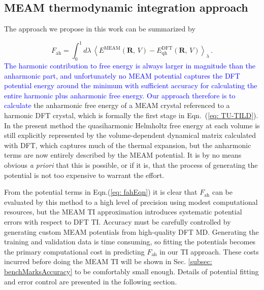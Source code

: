 \documentclass[twocolumn,american,aps,prb,showpacs,showkeys,amsmath,amssymb,superscriptaddress,a4]{revtex4-1}
\begin{document}
\subsection{MEAM thermodynamic integration approach\label{subsec: MTILDapproach}}

The approach we propose in this work can be summarized by

\begin{equation}
F_{\text{ah}}^{\text{}}=\int_{0}^{1}d\lambda\,\left\langle E^{\text{MEAM}}(\mathbf{R},\,V)-E_{\text{qh}}^{\text{DFT}}(\mathbf{R},\,V)\right\rangle _{\lambda}\,.
\label{eq: fahEqn}
\end{equation}
  \textcolor{blue}{The harmonic contribution to free energy is always larger in magnitude than the anharmonic part,  and unfortunately no MEAM potential captures the DFT  potential energy around the minimum with sufficient accuracy for calculating the entire harmonic plus anharmonic free energy.}
\textcolor{blue}{Our approach therefore is to calculate} the anharmonic free energy of a MEAM crystal
referenced to a harmonic DFT crystal, which is formally the first stage in 
Eqn.~(\ref{eq: TU-TILD}). In the present method the quasiharmonic Helmholtz free energy at each volume is still explicitly represented by the volume-dependent dynamical matrix calculated with DFT, which captures much of the thermal expansion, but the anharmonic terms are now entirely described by the MEAM potential.
It is by no means obvious \emph{a priori} that this is possible, or if it is, that the process of generating the potential is not too expensive to 
warrant the effort.

From the potential terms in Eqn.(\ref{eq: fahEqn}) it is clear that $F_{\text{ah}}^{\text{}}$ can be evaluated by this method to a high level of precision using modest
computational resources, but the MEAM TI approximation introduces
systematic potential errors with respect to DFT TI. Accuracy must
be carefully controlled by generating custom MEAM potentials from
high-quality DFT MD. Generating 
the training and validation data is time consuming,  so fitting the potentials becomes
the  primary computational cost in predicting $F_{\text{ah}}$
in our TI approach. These costs incurred before doing the
MEAM TI will be shown in Sec. \ref{subsec: benchMarksAccuracy} to
be comfortably small enough. Details of potential fitting
and error control are presented in the following section.
\end{document}
